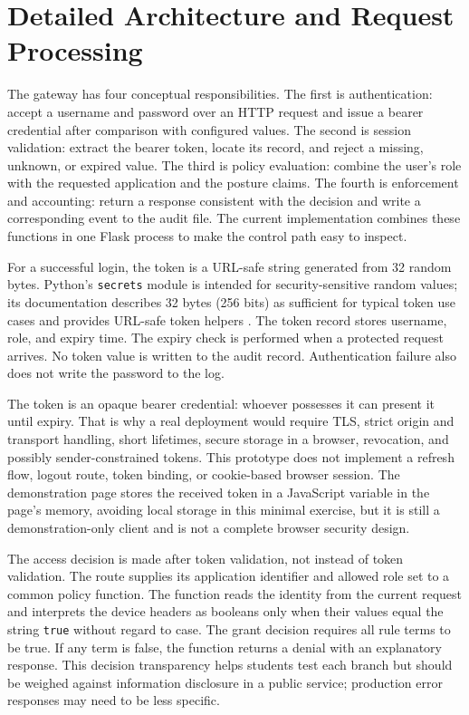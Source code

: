\section{Detailed Architecture and Request Processing}
The gateway has four conceptual responsibilities. The first is authentication: accept a username and password over an HTTP request and issue a bearer credential after comparison with configured values. The second is session validation: extract the bearer token, locate its record, and reject a missing, unknown, or expired value. The third is policy evaluation: combine the user's role with the requested application and the posture claims. The fourth is enforcement and accounting: return a response consistent with the decision and write a corresponding event to the audit file. The current implementation combines these functions in one Flask process to make the control path easy to inspect.

For a successful login, the token is a URL-safe string generated from 32 random bytes. Python's \texttt{secrets} module is intended for security-sensitive random values; its documentation describes 32 bytes (256 bits) as sufficient for typical token use cases and provides URL-safe token helpers \cite{pythonSecrets}. The token record stores username, role, and expiry time. The expiry check is performed when a protected request arrives. No token value is written to the audit record. Authentication failure also does not write the password to the log.

The token is an opaque bearer credential: whoever possesses it can present it until expiry. That is why a real deployment would require TLS, strict origin and transport handling, short lifetimes, secure storage in a browser, revocation, and possibly sender-constrained tokens. This prototype does not implement a refresh flow, logout route, token binding, or cookie-based browser session. The demonstration page stores the received token in a JavaScript variable in the page's memory, avoiding local storage in this minimal exercise, but it is still a demonstration-only client and is not a complete browser security design.

The access decision is made after token validation, not instead of token validation. The route supplies its application identifier and allowed role set to a common policy function. The function reads the identity from the current request and interprets the device headers as booleans only when their values equal the string \texttt{true} without regard to case. The grant decision requires all rule terms to be true. If any term is false, the function returns a denial with an explanatory response. This decision transparency helps students test each branch but should be weighed against information disclosure in a public service; production error responses may need to be less specific.

